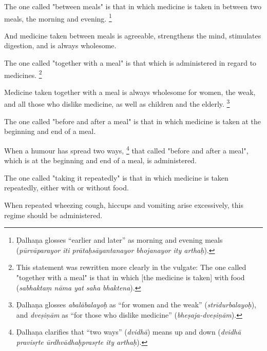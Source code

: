 \begin{translation}
	\item[94]
	The one called "between meals" is that in which medicine is taken in between two meals, the morning and evening.%
	\footnote{Ḍalhaṇa glosses ``earlier and later'' as morning and evening meals (\emph{pūrvāparayor iti prātaḥsāyantanayor bhojanayor ity arthaḥ}). }

	\item[95]
	And medicine %
	taken between meals %
	is agreeable, %
	strengthens the mind, stimulates digestion, and is always wholesome.

	\item[96]
	The one called "together with a meal" is that which is administered in regard to medicines.%
	\footnote{This statement was rewritten more clearly in the vulgate: The one called "together with a meal" is that in which [the medicine is taken] with food (\emph{sabhaktaṃ nāma yat saha bhaktena}).}

	\item[97]
	Medicine taken together with a meal %
	is always wholesome for women, %
	the weak, %
	and all those who dislike medicine, %
	as well as children and the elderly.%
	\footnote{Ḍalhaṇa glosses \emph{abalābalayoḥ} as ``for women and the weak'' (\emph{strīdurbalayoḥ}), and \emph{dveṣiṇām} as ``for those who dislike medicine'' (\emph{bheṣaja-dveṣiṇām}).}

	\item[98]
	The one called "before and after a meal" is that in which medicine is taken at the beginning and end of a meal.

	\item[99]
	When a humour has spread two ways,%
	\footnote{Ḍalhaṇa clarifies that ``two ways'' (\emph{dvidhā}) means up and down (\emph{dvidhā pravisṛte ūrdhvādhaḥprasṛte ity arthaḥ}).}
	that called "before and after a meal", %
	which is at the beginning and end of a meal, %
	is administered. %

	\item[100]
	The one called "taking it repeatedly" is that in which medicine is taken repeatedly, either with or without food.

	\item[101]
	When repeated %
	wheezing %
	cough, hiccups and vomiting %
	arise excessively,  %
	this regime %
	should be administered.


\end{translation}
